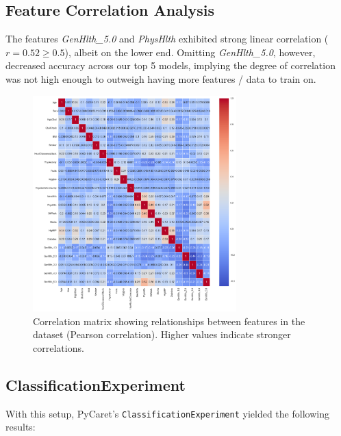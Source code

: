 \documentclass[a4paper,12pt]{article}
\begin{document}
\subsection{Feature Correlation Analysis}
The features \textit{GenHlth\_5.0} and \textit{PhysHlth} exhibited strong linear correlation ($r = 0.52 \geq 0.5$),
albeit on the lower end. Omitting \textit{GenHlth\_5.0}, however, decreased accuracy across our top 5 models,
implying the degree of correlation was not high enough to outweigh having more features / data to train 
on.

\begin{figure}[H]
    \centering
    \includegraphics[width=0.7\textwidth]{correlation_matrix.png}
    \caption{Correlation matrix showing relationships between features in the dataset (Pearson correlation). 
    Higher values indicate stronger correlations.}
    \label{fig:correlation_matrix}
\end{figure}

\subsection{ClassificationExperiment}
With this setup, PyCaret's \texttt{ClassificationExperiment} yielded the following results:
\end{document}
